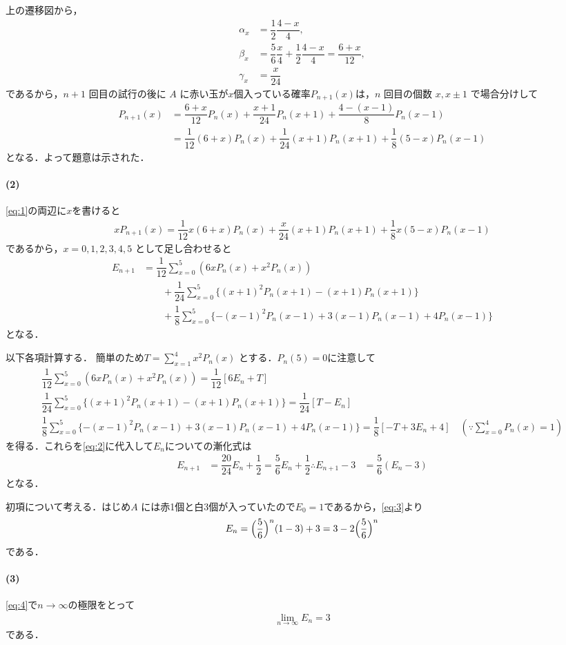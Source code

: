 \documentclass[../../main.tex]{subfiles}
\begin{document}
上の遷移図から，
\begin{align}
  \alpha_x &= \dfrac{1}{2} \dfrac{4-x}{4}, \\
  \beta_x &= \dfrac{5}{6} \dfrac{x}{4} + \dfrac{1}{2} \dfrac{4-x}{4} = \dfrac{6+x}{12}, \\
  \gamma_x &= \dfrac{x}{24}
\end{align}
であるから，$n+1$ 回目の試行の後に $A$ に赤い玉が$x$個入っている確率$P_{n+1}(x)$は，$n$ 回目の個数 $x, x \pm 1$ で場合分けして
\begin{align}
  P_{n+1}(x)
  &= \dfrac{6+x}{12} P_n(x) + \dfrac{x+1}{24} P_n(x+1) + \dfrac{4-(x-1)}{8} P_n(x-1) \\
  &= \dfrac{1}{12}(6+x) P_n(x) + \dfrac{1}{24}(x+1) P_n(x+1) + \dfrac{1}{8}(5-x) P_n(x-1) \label{eq:1}
\end{align}
となる．よって題意は示された．

\paragraph{(2)}

\cref{eq:1}の両辺に$x$を書けると
\begin{align}
  x P_{n+1}(x) = \dfrac{1}{12} x (6+x) P_n(x) + \dfrac{x}{24} (x+1) P_n(x+1) + \dfrac{1}{8} x (5-x) P_n(x-1)
\end{align}
であるから，$x = 0, 1, 2, 3, 4, 5$ として足し合わせると
\begin{align}
  E_{n+1} &= \dfrac{1}{12} \sum_{x=0}^5 (6x P_n(x) + x^2 P_n(x)) \\
  &\qquad + \dfrac{1}{24} \sum_{x=0}^5 \{(x+1)^2 P_n(x+1) - (x+1) P_n(x+1)\} \\
  &\qquad + \dfrac{1}{8} \sum_{x=0}^5 \{-(x-1)^2 P_n(x-1) + 3(x-1) P_n(x-1) + 4 P_n(x-1)\} \label{eq:2}
\end{align}
となる．

以下各項計算する． 簡単のため$T = \sum_{x=1}^4 x^2 P_n(x)$ とする．$P_n(5) = 0$に注意して
\begin{align}
  \dfrac{1}{12} \sum_{x=0}^5 (6x P_n(x) + x^2 P_n(x)) = \dfrac{1}{12} [ 6 E_n + T ] \\
  \dfrac{1}{24} \sum_{x=0}^5 \{(x+1)^2 P_n(x+1) - (x+1) P_n(x+1)\} = \dfrac{1}{24} [ T - E_n ] \\
  \dfrac{1}{8} \sum_{x=0}^5 \{-(x-1)^2 P_n(x-1) + 3(x-1) P_n(x-1) + 4 P_n(x-1)\} = \dfrac{1}{8} [ -T + 3 E_n + 4 ] \quad (\because \sum_{x=0}^4 P_n(x) = 1)
\end{align}
を得る．これらを\cref{eq:2}に代入して$E_{n}$についての漸化式は
\begin{align}
  E_{n+1} &= \dfrac{20}{24} E_n + \dfrac{1}{2} = \dfrac{5}{6} E_n + \dfrac{1}{2}
  \therefore
  E_{n+1} - 3 &= \dfrac{5}{6} (E_n - 3) \label{eq:3}
\end{align}
となる．

初項について考える．はじめ$A$ には赤1個と白3個が入っていたので$E_0 = 1$であるから，\cref{eq:3}より
\begin{align}
  E_n = \Bigl(\dfrac{5}{6}\Bigr)^n (1 - 3) + 3 = 3 - 2 \Bigl(\dfrac{5}{6}\Bigr)^n \label{eq:4}
\end{align}
である．

\paragraph{(3)}
\cref{eq:4}で$n\to\infty$の極限をとって
\begin{align}
  \lim_{n\to\infty} E_n = 3
\end{align}
である．
\end{document}
